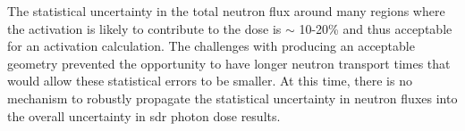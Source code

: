 \documentclass[12pt]{article}
\begin{document}

The statistical uncertainty in the total neutron flux around many regions where the
activation is likely to contribute to the dose is $\sim$ 10-20\% and thus
acceptable for an activation calculation.  The challenges with producing an acceptable 
geometry prevented the opportunity to have longer neutron transport times that would
allow these statistical errors to be smaller.  At this time, there is no mechanism to
robustly propagate the statistical uncertainty in neutron fluxes into the overall
uncertainty in \gls{sdr} photon dose results.

\newpage
\clearpage
\end{document}
